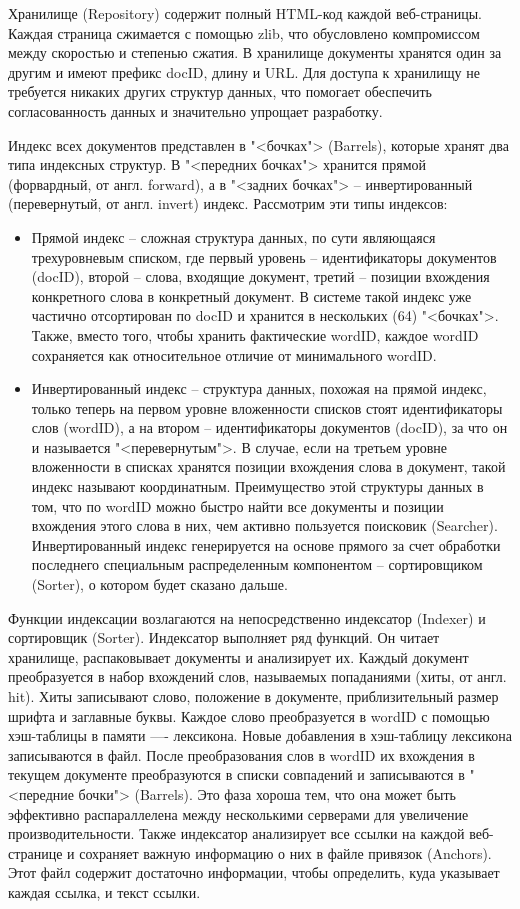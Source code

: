 Хранилище  (Repository) содержит полный HTML-код каждой веб-страницы. Каждая страница сжимается с помощью zlib, что обусловлено компромиссом между скоростью и степенью сжатия. 
В хранилище документы хранятся один за другим и имеют префикс docID, длину и URL. Для доступа к хранилищу не требуется никаких других структур данных, что помогает обеспечить согласованность данных и значительно упрощает разработку.

Индекс всех документов представлен в "<бочках"> (Barrels), которые хранят два типа индексных структур. В "<передних бочках"> хранится прямой (форвардный, от англ. forward), а в "<задних бочках"> -- инвертированный (перевернутый, от англ. invert) индекс. Рассмотрим эти типы индексов:
\begin{itemize}
\item Прямой индекс -- сложная структура данных, по сути являющаяся трехуровневым списком, где первый уровень -- идентификаторы документов (docID), второй -- слова, входящие документ, третий -- позиции вхождения конкретного слова в конкретный документ.
В системе такой индекс уже частично отсортирован по docID и хранится в нескольких (64) "<бочках">. Также, вместо того, чтобы хранить фактические wordID, каждое wordID сохраняется как относительное отличие от минимального wordID.
\item Инвертированный индекс -- структура данных, похожая на прямой индекс, только теперь на первом уровне вложенности списков стоят идентификаторы слов (wordID), а на втором -- идентификаторы документов (docID), за что он и называется "<перевернутым">. В случае, если на третьем уровне вложенности в списках хранятся позиции вхождения слова в документ, такой индекс называют координатным. Преимущество этой структуры данных в том, что по wordID можно быстро найти все документы и позиции вхождения этого слова в них, чем активно пользуется поисковик (Searcher).
Инвертированный индекс генерируется на основе прямого за счет обработки последнего специальным распределенным компонентом -- сортировщиком (Sorter), о котором будет сказано дальше.
\end{itemize}

Функции индексации возлагаются на непосредственно индексатор (Indexer) и сортировщик (Sorter). Индексатор выполняет ряд функций. Он читает хранилище, распаковывает документы и анализирует их. Каждый документ преобразуется в набор вхождений слов, называемых попаданиями (хиты, от англ. hit). Хиты записывают слово, положение в документе, приблизительный размер шрифта и заглавные буквы. Каждое слово преобразуется в wordID с помощью хэш-таблицы в памяти —- лексикона. Новые добавления в хэш-таблицу лексикона записываются в файл. После преобразования слов в wordID их вхождения в текущем документе преобразуются в списки совпадений и записываются в "<передние бочки"> (Barrels). Это фаза хороша тем, что она может быть эффективно распараллелена между несколькими серверами для увеличение производительности. Также индексатор анализирует все ссылки на каждой веб-странице и сохраняет важную информацию о них в файле привязок (Anchors). Этот файл содержит достаточно информации, чтобы определить, куда указывает каждая ссылка, и текст ссылки. 

